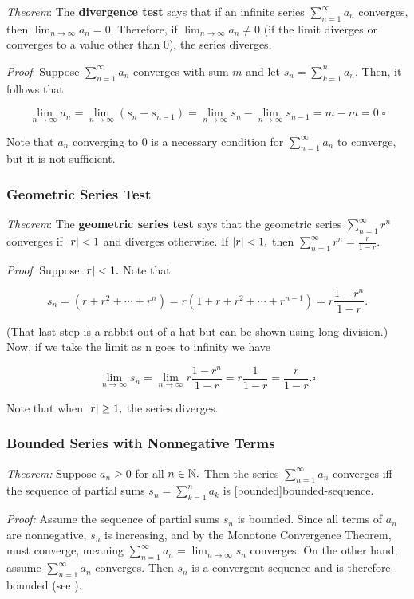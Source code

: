 \documentclass{article}
\begin{document}
\emph{Theorem}: The \textbf{divergence test} says that if an infinite series $\sum_{n=1}^{\infty}{a_n}$ converges, then $\lim_{n \to \infty}{a_n} = 0.$ Therefore, if $\lim_{n \to \infty}{a_n} \neq 0$ (if the limit diverges or converges to a value other than 0), the series diverges.

\emph{Proof}: Suppose $\sum_{n=1}^{\infty}{a_n}$ converges with sum $m$ and let $s_n = \sum_{k=1}^{n} a_n.$ Then, it follows that

\[ \lim_{n \to \infty} a_n = \lim_{n \to \infty}{(s_n - s_{n-1})} = \lim_{n \to \infty}{s_n} - \lim_{n \to \infty}{s_{n-1}} = m - m = 0. \square \]

Note that $a_n$ converging to $0$ is a necessary condition for $\sum_{n=1}^{\infty}{a_n}$ to converge, but it is not sufficient.

\subsubsection{Geometric Series Test}

\emph{Theorem}: The \textbf{geometric series test} says that the geometric series $\sum_{n=1}^{\infty}{r^n}$ converges if $\left| r \right| < 1$ and diverges otherwise. If $\left| r \right| < 1,$ then $\sum_{n=1}^{\infty}{r^n} = \frac{r}{1 - r}.$

\emph{Proof}: Suppose $\left| r \right| < 1.$ Note that

\[ s_n = (r + r^2 + \cdots + r^n) = r(1 + r + r^2 + \cdots + r^{n-1}) = r\frac{1-r^n}{1 - r}. \]

(That last step is a rabbit out of a hat but can be shown using long division.) Now, if we take the limit as n goes to infinity we have

\[ \lim_{n \to \infty}{s_n} = \lim_{n \to \infty}{r \frac{1 - r^n}{1 - r}} = r \frac{1}{1 - r} = \frac{r}{1 - r}. \square \]

Note that when $\left| r \right| \geq 1,$ the series diverges.

\subsubsection{Bounded Series with Nonnegative Terms}

\emph{Theorem:} Suppose $a_n \geq 0$ for all $n \in \mathbb{N}.$ Then the series $\sum_{n=1}^{\infty}{a_n}$ converges iff the sequence of partial sums $s_n = \sum_{k=1}^{n}{a_k}$ is \@[bounded]{bounded-sequence}.

\emph{Proof:} Assume the sequence of partial sums $s_n$ is bounded. Since all terms of $a_n$ are nonnegative, $s_n$ is increasing, and by the Monotone Convergence Theorem, must converge, meaning $\sum_{n=1}^{\infty}{a_n} = \lim_{n \to \infty} s_n$ converges. On the other hand, assume $\sum_{n=1}^{\infty}{a_n}$ converges. Then $s_n$ is a \@{convergent} sequence and is therefore bounded (see ).
\end{document}
